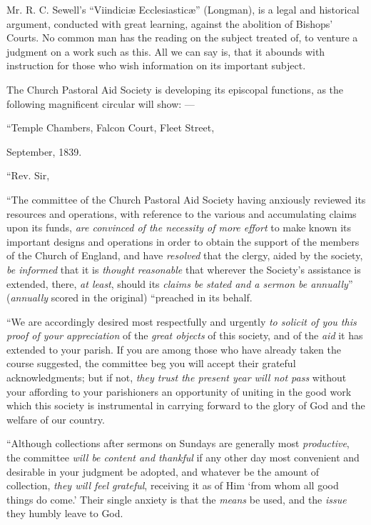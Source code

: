 Mr. R. C. Sewell's ``Viindiciæ Ecclesiasticæ'' (Longman),
is a legal and historical argument, conducted with great learning,
against the abolition of Bishops' Courts. No common man has the reading
on the subject treated of, to venture a judgment on a work such as this.
All we can say is, that it abounds with instruction for those who wish
information on its important subject.

The Church Pastoral Aid Society is developing its
episcopal functions, as the following magnificent circular will show:
—

``Temple Chambers, Falcon Court, Fleet Street,

September, 1839.

``Rev. Sir,

``The committee of the Church Pastoral Aid Society having anxiously
reviewed its resources and operations, with reference to the various and
accumulating claims upon its funds, \emph{are convinced of the necessity of
more effort} to make known its important designs and operations in
order to obtain the support of the members of the Church of England, and
have \emph{resolved} that the clergy, aided by the society, \emph{be
informed} that it is \emph{thought reasonable} that wherever the
Society's assistance is extended, there, \emph{at least}, should its \emph{claims
be stated and a sermon be annually}'' (\emph{annually} scored in the
original) ``preached in its behalf.

``We are accordingly desired most respectfully and
urgently \emph{to solicit of you this proof of your appreciation} of the
\emph{great objects} of this society, and of the \emph{aid} it has
extended to your parish. If you are among those who have already taken
the course suggested, the committee beg you will accept their grateful
acknowledgments; but if not, \emph{they trust the present year will not
pass} without your affording to your parishioners an opportunity of
uniting in the good work which this society is instrumental in carrying
forward to the glory of God and the welfare of our country.

``Although collections after sermons on Sundays are
generally most \emph{productive}, the committee \emph{will be content and
thankful} if any other day most convenient and desirable in your
judgment be adopted, and whatever be the amount of collection, \emph{they
will feel grateful}, receiving it as of Him ‘from whom all good
things do come.' Their single anxiety is that the \emph{means} be used,
and the \emph{issue} they humbly leave to God.


